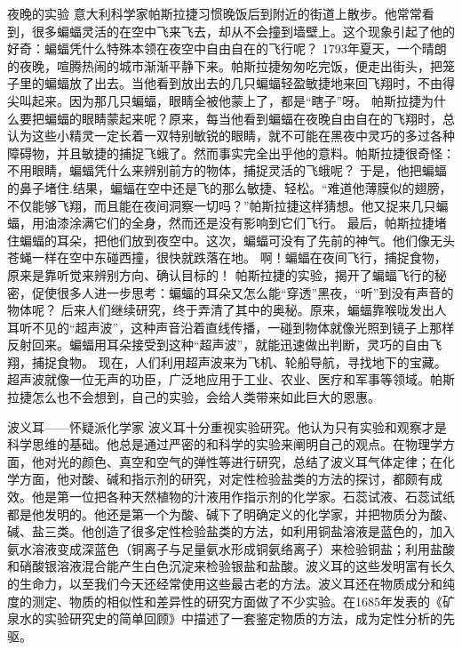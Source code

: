 \documentclass[a4paper]{article}
\begin{document}
 夜晚的实验
    意大利科学家帕斯拉捷习惯晚饭后到附近的街道上散步。他常常看到，很多蝙蝠灵活的在空中飞来飞去，却从不会撞到墙壁上。这个现象引起了他的好奇：蝙蝠凭什么特殊本领在夜空中自由自在的飞行呢？
    1793年夏天，一个晴朗的夜晚，喧腾热闹的城市渐渐平静下来。帕斯拉捷匆匆吃完饭，便走出街头，把笼子里的蝙蝠放了出去。当他看到放出去的几只蝙蝠轻盈敏捷地来回飞翔时，不由得尖叫起来。因为那几只蝙蝠，眼睛全被他蒙上了，都是“瞎子”呀。
    帕斯拉捷为什么要把蝙蝠的眼睛蒙起来呢？原来，每当他看到蝙蝠在夜晚自由自在的飞翔时，总认为这些小精灵一定长着一双特别敏锐的眼睛，就不可能在黑夜中灵巧的多过各种障碍物，并且敏捷的捕捉飞蛾了。然而事实完全出乎他的意料。帕斯拉捷很奇怪：不用眼睛，蝙蝠凭什么来辨别前方的物体，捕捉灵活的飞蛾呢？
    于是，他把蝙蝠的鼻子堵住.结果，蝙蝠在空中还是飞的那么敏捷、轻松。“难道他薄膜似的翅膀，不仅能够飞翔，而且能在夜间洞察一切吗？”帕斯拉捷这样猜想。他又捉来几只蝙蝠，用油漆涂满它们的全身，然而还是没有影响到它们飞行。
    最后，帕斯拉捷堵住蝙蝠的耳朵，把他们放到夜空中。这次，蝙蝠可没有了先前的神气。他们像无头苍蝇一样在空中东碰西撞，很快就跌落在地。
    啊！蝙蝠在夜间飞行，捕捉食物，原来是靠听觉来辨别方向、确认目标的！
    帕斯拉捷的实验，揭开了蝙蝠飞行的秘密，促使很多人进一步思考：蝙蝠的耳朵又怎么能“穿透”黑夜，“听”到没有声音的物体呢？
    后来人们继续研究，终于弄清了其中的奥秘。原来，蝙蝠靠喉咙发出人耳听不见的“超声波”，这种声音沿着直线传播，一碰到物体就像光照到镜子上那样反射回来。蝙蝠用耳朵接受到这种“超声波”，就能迅速做出判断，灵巧的自由飞翔，捕捉食物。
    现在，人们利用超声波来为飞机、轮船导航，寻找地下的宝藏。超声波就像一位无声的功臣，广泛地应用于工业、农业、医疗和军事等领域。帕斯拉捷怎么也不会想到，自己的实验，会给人类带来如此巨大的恩惠。

波义耳——怀疑派化学家
波义耳十分重视实验研究。他认为只有实验和观察才是科学思维的基础。他总是通过严密的和科学的实验来阐明自己的观点。在物理学方面，他对光的颜色、真空和空气的弹性等进行研究，总结了波义耳气体定律；在化学方面，他对酸、碱和指示剂的研究，对定性检验盐类的方法的探讨，都颇有成效。他是第一位把各种天然植物的汁液用作指示剂的化学家。石蕊试液、石蕊试纸都是他发明的。他还是第一个为酸、碱下了明确定义的化学家，并把物质分为酸、碱、盐三类。他创造了很多定性检验盐类的方法，如利用铜盐溶液是蓝色的，加入氨水溶液变成深蓝色（铜离子与足量氨水形成铜氨络离子）来检验铜盐；利用盐酸和硝酸银溶液混合能产生白色沉淀来检验银盐和盐酸。波义耳的这些发明富有长久的生命力，以至我们今天还经常使用这些最古老的方法。波义耳还在物质成分和纯度的测定、物质的相似性和差异性的研究方面做了不少实验。在1685年发表的《矿泉水的实验研究史的简单回顾》中描述了一套鉴定物质的方法，成为定性分析的先驱。 
\end{document}
